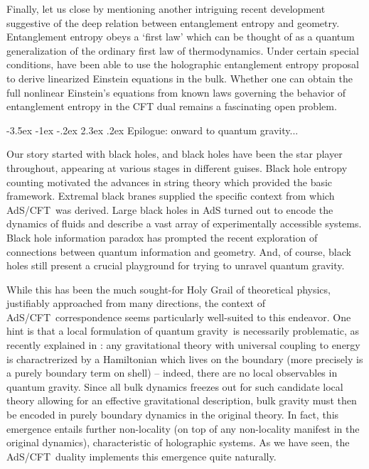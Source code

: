 \documentclass[12pt]{article}
\makeatletter
\renewcommand\section{\@startsection {section}{1}{\z@}%
                                   {-3.5ex \@plus -1ex \@minus -.2ex}%
                                   {2.3ex \@plus.2ex}%
                                   {\normalfont\large\bfseries}}
\def\AC{AdS/CFT}
\def\QG{quantum gravity}
\makeatother
\begin{document}
Finally, let us close by mentioning another intriguing recent development suggestive of the deep relation between entanglement entropy and geometry.  
Entanglement entropy obeys a `first law' which can be thought of as a  quantum generalization of the ordinary first law of thermodynamics.
  Under certain special conditions,  \cite{Faulkner:2013ica} have been able to use the holographic entanglement entropy proposal to derive   linearized Einstein equations in the bulk.  Whether one can obtain the full nonlinear Einstein's equations from known laws governing the behavior of entanglement entropy in the CFT dual remains a fascinating open problem.



\section{Epilogue: onward to quantum gravity...}
\label{s:concl}

Our story started with black holes, and black holes have been the star player throughout, appearing at various stages in different guises.  
Black hole entropy counting motivated the advances in string theory which provided the basic framework.  Extremal black branes supplied the specific context from which \AC\ was derived.  Large black holes in AdS turned out to encode the dynamics of fluids and describe a vast array of experimentally accessible systems.  Black hole information paradox has prompted the recent exploration of connections between quantum information and geometry.  
And, of course, black holes still present a crucial playground for trying to unravel \QG.

While this has been the much sought-for Holy Grail of theoretical physics, justifiably approached from many directions, the context of \AC\ correspondence seems particularly well-suited to this endeavor.  One hint is that a local formulation of \QG\ is necessarily problematic, as recently explained in \cite{Marolf:2014yga}: any gravitational theory with universal coupling to energy is charactrerized by a Hamiltonian which lives on the boundary (more precisely is a purely boundary term on shell) -- indeed, there are no local observables in quantum gravity. 
Since all bulk dynamics freezes out for such candidate local theory allowing for an effective gravitational description,  bulk gravity must then be encoded in purely boundary dynamics in the original theory.  In fact, this emergence entails further non-locality (on top of any non-locality manifest in the original dynamics), characteristic of holographic systems.  As we have seen, the \AC\ duality implements this emergence quite naturally.
\end{document}
